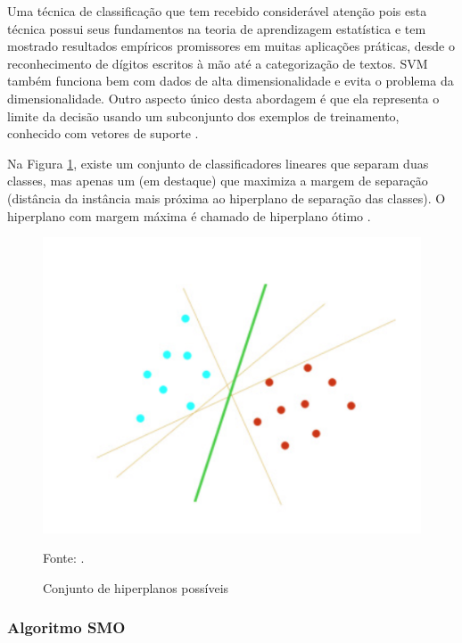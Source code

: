 \documentclass[
	12pt,				%
	openright,			%
	oneside,	
	a4paper,				%
	english,				%
	brazil				%
]{abntex2/abntex2} %
\begin{document}
	Uma técnica de classificação que tem recebido considerável atenção pois esta técnica possui seus fundamentos na teoria de aprendizagem estatística e tem mostrado resultados empíricos promissores em muitas aplicações práticas, desde o reconhecimento de dígitos escritos à mão até a categorização de textos. SVM também funciona bem com dados de alta dimensionalidade e evita o problema da dimensionalidade. Outro aspecto único desta abordagem é que ela representa o limite da decisão usando um subconjunto dos exemplos de treinamento, conhecido com vetores de suporte \cite{tan:2009}.
	
	Na Figura \ref{figsvmHiperPlanos}, existe um conjunto de classificadores lineares que separam duas classes, mas apenas um (em destaque) que maximiza a margem de separação (distância da instância mais próxima ao hiperplano de separação das classes). O hiperplano com margem máxima é chamado de hiperplano ótimo \cite{junior:2010}.
	\\
	\begin{figure}[!htb]
		\caption{\label{figsvmHiperPlanos} Conjunto de hiperplanos possíveis}
		\begin{center}
			\includegraphics[scale=0.5]{img/svmHiperPlanos.png}
		\end{center}
		Fonte: \cite{junior:2010}.
	\end{figure}
	
	\subsubsection{Algoritmo SMO}
	
\end{document}
